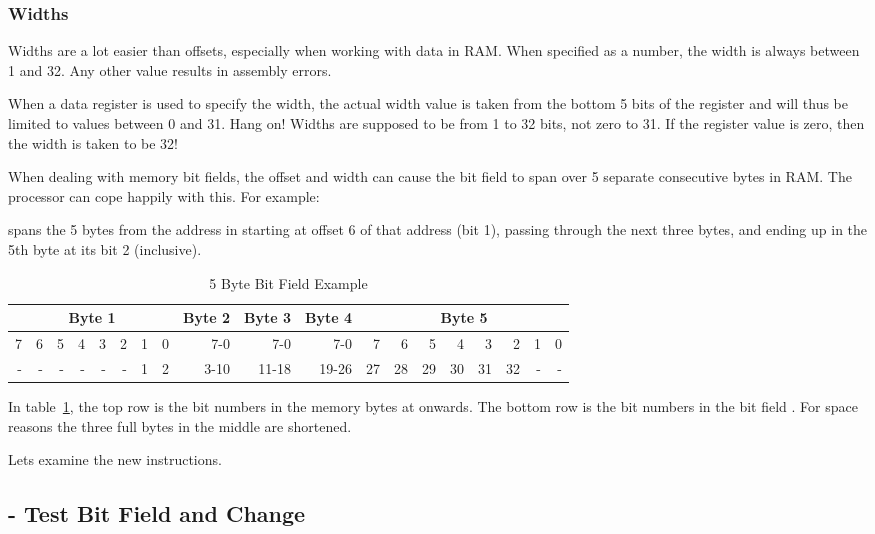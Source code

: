 \subsubsection{Widths}

Widths are a lot easier than offsets, especially when working with data in RAM. When specified as a number, the width is always between 1 and 32. Any other value results in assembly errors.

When a data register is used to specify the width, the actual width value is taken from the bottom 5 bits of the register and will thus be limited to values between 0 and 31. Hang on! Widths are supposed to be from 1 to 32 bits, not zero to 31. If the register value is zero, then the width is taken to be 32!

When dealing with memory bit fields, the offset and width can cause the bit field to span over 5 separate consecutive bytes in RAM. The processor can cope happily with this. For example:

 spans the 5 bytes from the address in  starting at offset 6 of that address (bit 1), passing through the next three bytes, and ending up in the 5th byte at its bit 2 (inclusive).

\begin{table}[h]
	\centering
	\begin{tabular}{r|r|r|r|r|r|r|r|r|r|r|r|r|r|r|r|r|r|r}
		\multicolumn{8}{c|}{Byte 1} & Byte 2 & Byte 3 & Byte 4 & \multicolumn{8}{|c}{Byte 5}\\
		\midrule
        7&6&5&4&3&2&1&0 & 7-0 & 7-0   & 7-0   & 7&6 &5 &4 &3 &2 &1&0\\
        -&-&-&-&-&-&1&2 & 3-10 & 11-18 & 19-26&27&28&29&30&31&32&-&-\\
	\end{tabular}
	\caption{5 Byte Bit Field Example}
	\label{tab-5BBFE}
\end{table}

In table~\ref{tab-5BBFE}, the top row is the bit numbers in the memory bytes at  onwards. The bottom row is the bit numbers in the bit field . For space reasons the three full bytes in the middle are shortened.

Lets examine the new instructions.

\subsection{ - Test Bit Field and Change}

